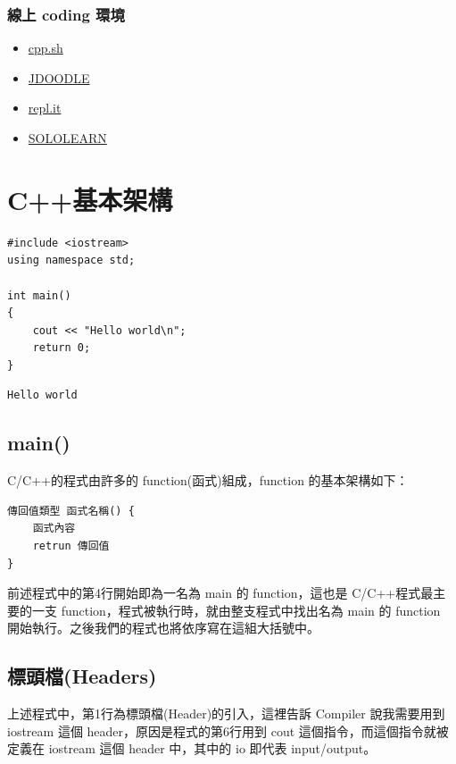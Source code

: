 \documentclass[12pt,a4paper]{article}
\begin{document}
\subsubsection{線上 coding 環境}
\label{sec:org4309eb3}
\begin{itemize}
\item \href{http://cpp.sh/}{cpp.sh}
\item \href{https://www.jdoodle.com/online-compiler-c++/}{JDOODLE}
\item \href{https://repl.it/languages/cpp}{repl.it}
\item \href{https://code.sololearn.com/\#cpp}{SOLOLEARN}
\end{itemize}

\section{C++基本架構}
\label{cpp_arch}
\lstset{breaklines=true,language=cpp,label= ,caption= ,captionpos=b,firstnumber=1,numbers=left}
\begin{lstlisting}
#include <iostream>
using namespace std;

int main()
{
    cout << "Hello world\n";
    return 0;
}
\end{lstlisting}

\begin{verbatim}
Hello world
\end{verbatim}
\subsection{main()}
\label{sec:orgc69b111}
C/C++的程式由許多的 function(函式)組成，function 的基本架構如下：
\lstset{breaklines=true,language=cpp,label= ,caption= ,captionpos=b,numbers=none}
\begin{lstlisting}
傳回值類型 函式名稱() {
    函式內容
    retrun 傳回值
}
\end{lstlisting}
前述程式中的第4行開始即為一名為 main 的 function，這也是 C/C++程式最主要的一支 function，程式被執行時，就由整支程式中找出名為 main 的 function 開始執行。之後我們的程式也將依序寫在這組大括號中。

\subsection{標頭檔(Headers)}
\label{sec:orgca71d68}
上述程式中，第1行為標頭檔(Header)的引入，這裡告訴 Compiler 說我需要用到 iostream 這個 header，原因是程式的第6行用到 cout 這個指令，而這個指令就被定義在 iostream 這個 header 中，其中的 io 即代表 input/output。
\end{document}
